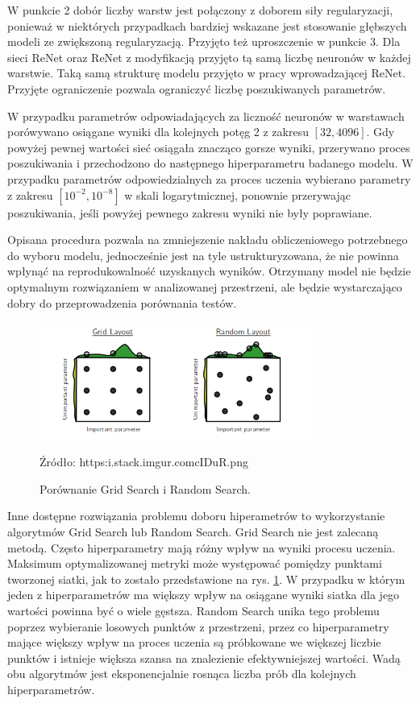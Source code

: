 \documentclass[oneside, mag]{mgr}
\begin{document}
W punkcie 2 dobór liczby warstw jest połączony z doborem siły regularyzacji, ponieważ w niektórych przypadkach bardziej wskazane jest stosowanie głębszych modeli ze zwiększoną regularyzacją. Przyjęto też uproszczenie w punkcie 3. Dla sieci ReNet oraz ReNet z modyfikacją przyjęto tą samą liczbę neuronów w każdej warstwie. Taką samą strukturę modelu przyjęto w pracy wprowadzającej ReNet. Przyjęte ograniczenie pozwala ograniczyć liczbę poszukiwanych parametrów.

W przypadku parametrów odpowiadających za liczność neuronów w warstawach porówywano osiągane wyniki dla kolejnych potęg 2 z zakresu $[32, 4096]$. Gdy powyżej pewnej wartości sieć osiągała znacząco gorsze wyniki, przerywano proces poszukiwania i przechodzono do następnego hiperparametru badanego modelu. W przypadku parametrów odpowiedzialnych za proces uczenia wybierano parametry z zakresu $[10^{-2}, 10^{-8}]$ w skali logarytmicznej, ponownie przerywając poszukiwania, jeśli powyżej pewnego zakresu wyniki nie były poprawiane.

Opisana procedura pozwala na zmniejszenie nakładu obliczeniowego potrzebnego do wyboru modelu, jednocześnie jest na tyle ustrukturyzowana, że nie powinna wpłynąć na reprodukowalność uzyskanych wyników. Otrzymany model nie będzie optymalnym rozwiązaniem w analizowanej przestrzeni, ale będzie wystarczająco dobry do przeprowadzenia porównania testów.

\begin{figure}
\centering
	\includegraphics[width=0.8\textwidth]{img/grid_search.png}
	\caption{Porównanie Grid Search i Random Search.} Źródło: https:\/\/i.stack.imgur.com\/cIDuR.png
	\label{fig:hyperparams}
\end{figure}

Inne dostępne rozwiązania problemu doboru hiperametrów to wykorzystanie algorytmów Grid Search lub Random Search. Grid Search nie jest zalecaną metodą. Często hiperparametry mają różny wpływ na wyniki procesu uczenia. Maksimum optymalizowanej metryki może występować pomiędzy punktami tworzonej siatki, jak to zostało przedstawione na rys. \ref{fig:hyperparams}. W przypadku w którym jeden z hiperparametrów ma większy wpływ na osiągane wyniki siatka dla jego wartości powinna być o wiele gęstsza. Random Search unika tego problemu poprzez wybieranie losowych punktów z przestrzeni, przez co hiperparametry mające większy wpływ na proces uczenia są próbkowane we większej liczbie punktów i istnieje większa szansa na znalezienie efektywniejszej wartości. Wadą obu algorytmów jest eksponencjalnie rosnąca liczba prób dla kolejnych hiperparametrów.
\end{document}
